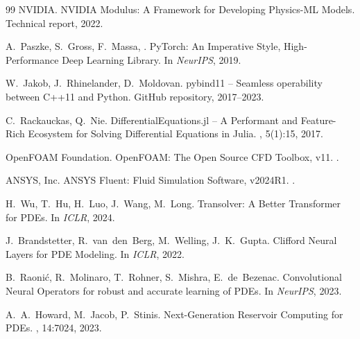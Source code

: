 \documentclass[10pt,twocolumn]{article}
\begin{document}
\begin{thebibliography}{99}
NVIDIA.
\newblock NVIDIA Modulus: A Framework for Developing
Physics-ML Models.
\newblock Technical report, 2022.

A.~Paszke, S.~Gross, F.~Massa, \etal.
\newblock PyTorch: An Imperative Style, High-Performance Deep
Learning Library.
\newblock In {\em NeurIPS}, 2019.

W.~Jakob, J.~Rhinelander, D.~Moldovan.
\newblock pybind11 -- Seamless operability between C++11 and
Python.
\newblock GitHub repository, 2017--2023.

C.~Rackauckas, Q.~Nie.
\newblock DifferentialEquations.jl -- A Performant and
Feature-Rich Ecosystem for Solving Differential Equations in
Julia.
, 5(1):15, 2017.

OpenFOAM Foundation.
\newblock OpenFOAM: The Open Source CFD Toolbox, v11.
.

ANSYS, Inc.
\newblock ANSYS Fluent: Fluid Simulation Software, v2024R1.
.

H.~Wu, T.~Hu, H.~Luo, J.~Wang, M.~Long.
\newblock Transolver: A Better Transformer for PDEs.
\newblock In {\em ICLR}, 2024.

J.~Brandstetter, R.~van~den~Berg, M.~Welling, J.~K.~Gupta.
\newblock Clifford Neural Layers for PDE Modeling.
\newblock In {\em ICLR}, 2022.

B.~Raoni\'c, R.~Molinaro, T.~Rohner, S.~Mishra, E.~de~Bezenac.
\newblock Convolutional Neural Operators for robust and
accurate learning of PDEs.
\newblock In {\em NeurIPS}, 2023.

A.~A.~Howard, M.~Jacob, P.~Stinis.
\newblock Next-Generation Reservoir Computing for PDEs.
, 14:7024, 2023.

\end{thebibliography}


\onecolumn
\appendix
\end{document}
